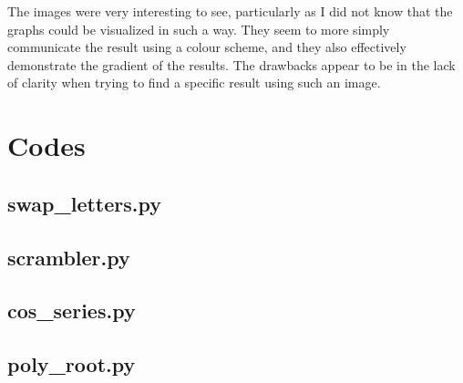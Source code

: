 \documentclass{article}
\begin{document}
The images were very interesting to see, particularly as I did not know that the graphs could be visualized in such a way. They seem to more simply communicate the
result using a colour scheme, and they also effectively demonstrate the gradient of the results. The drawbacks appear to be in the lack of clarity when trying to find
a specific result using such an image.

\pagebreak
\appendix
\section{Codes}


\lstset{style=python103, language=python} 

\subsection{swap\_letters.py}

\clearpage

\subsection{scrambler.py}

\clearpage

\subsection{cos\_series.py}

\clearpage

\subsection{poly\_root.py}

\clearpage 

\end{document}
